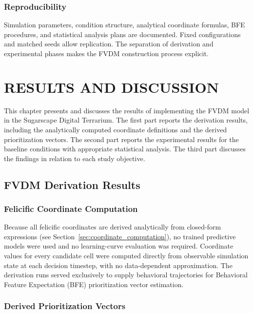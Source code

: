 \documentclass{icsthesis}
\begin{document}
\begin{mainmatter}
\subsubsection{Reproducibility}
Simulation parameters, condition structure, analytical coordinate formulas, BFE procedures, and statistical analysis plans are documented. Fixed configurations and matched seeds allow replication. The separation of derivation and experimental phases makes the FVDM construction process explicit.

\section{RESULTS AND DISCUSSION}

This chapter presents and discusses the results of implementing the FVDM model in the Sugarscape Digital Terrarium. The first part reports the derivation results, including the analytically computed coordinate definitions and the derived prioritization vectors. The second part reports the experimental results for the baseline conditions with appropriate statistical analysis. The third part discusses the findings in relation to each study objective.

\subsection{FVDM Derivation Results}

\subsubsection{Felicific Coordinate Computation}

Because all felicific coordinates are derived analytically from closed-form expressions (see Section~\ref{sec:coordinate_computation}), no trained predictive models were used and no learning-curve evaluation was required. Coordinate values for every candidate cell were computed directly from observable simulation state at each decision timestep, with no data-dependent approximation. The derivation runs served exclusively to supply behavioral trajectories for Behavioral Feature Expectation (BFE) prioritization vector estimation.

\subsubsection{Derived Prioritization Vectors}


\end{mainmatter}
\end{document}
